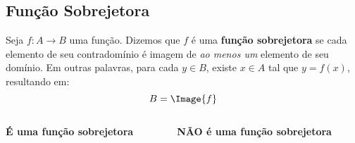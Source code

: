 \subsection{Função Sobrejetora}
\begin{frame}
  \begin{definition}
    Seja $f:A\rightarrow B$ uma função. Dizemos que $f$ é uma \textbf{função sobrejetora} se cada elemento de seu contradomínio é imagem de \emph{ao menos um} elemento de seu domínio. Em outras palavras, para cada $y\in B$, existe $x\in A$ tal que $y = f(x)$, resultando em:\vspace*{-0.2cm}
    \begin{equation*}
      B = \Image{f}\vspace*{-0.2cm}
    \end{equation*}
  \end{definition}
  \begin{columns}[onlytextwidth]
    \begin{column}{0.45\textwidth}\vspace*{-0.45cm}
      \begin{figure}
      \end{figure}
      \begin{center}
        \textbf{É uma função sobrejetora}
      \end{center}
    \end{column}
    \begin{column}{0.45\textwidth}\vspace*{-0.45cm}
      \begin{figure}
      \end{figure}
      \begin{center}
        \textbf{NÃO é uma função sobrejetora}
      \end{center}
    \end{column}
  \end{columns}
\end{frame}

